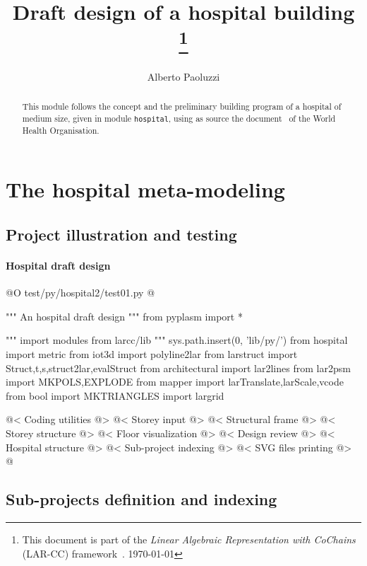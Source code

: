 \documentclass[11pt,oneside]{article}    %
\title{Draft design of a hospital building
\footnote{This document is part of the \emph{Linear Algebraic Representation with CoChains} (LAR-CC) framework~\cite{cclar-proj:2013:00}. \today}
}
\author{Alberto Paoluzzi}
\begin{document}
\maketitle
\tableofcontents

\begin{abstract}
This module follows the concept and the preliminary building program of a hospital of medium size, given in module \texttt{hospital}, using as source the document~\cite{who:2013} of the World Health Organisation. 
\end{abstract}


\section{The  hospital meta-modeling}

\subsection{Project illustration and testing}

\paragraph{Hospital draft design}
@O test/py/hospital2/test01.py
@{""" An hospital draft design """
from pyplasm import *

""" import modules from larcc/lib """
sys.path.insert(0, 'lib/py/')
from hospital import metric
from iot3d import polyline2lar
from larstruct import Struct,t,s,struct2lar,evalStruct
from architectural import lar2lines
from lar2psm import MKPOLS,EXPLODE
from mapper import larTranslate,larScale,vcode
from bool import MKTRIANGLES
import largrid
    
@< Coding utilities @>
@< Storey input @>
@< Structural frame @>
@< Storey structure @>
@< Floor visualization @>
@< Design review @>
@< Hospital structure @>
@< Sub-project indexing @>
@< SVG files printing @>
@}

\subsection{Sub-projects definition and indexing}
\end{document}
